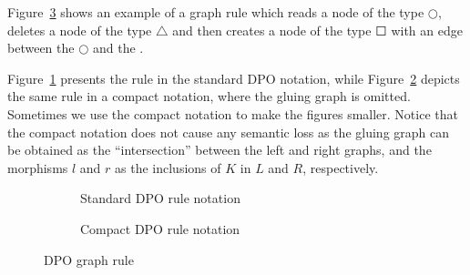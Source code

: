 \begin{example} Figure~\ref{fig:gts:rule} shows an example of a graph rule which reads a node of the type $\Circle$, deletes a node of the type $\triangle$ and then creates a node of the type $\Square$ with an edge between the $\Circle$ and the \Square. 
  
Figure~\ref{fig:gts:rule-standard} presents the rule in the standard DPO notation, while Figure~\ref{fig:gts:rule-compact} depicts the same rule in a compact notation, where the gluing graph is omitted. Sometimes we use the compact notation to make the figures smaller. Notice that the compact notation does not cause any semantic loss as the gluing graph can be obtained as the ``intersection'' between the left and right graphs, and the morphisms $l$ and $r$ as the inclusions of $K$ in $L$ and $R$, respectively.

\begin{figure}[!ht]
  \centering
  \begin{subfigure}[t]{.5\textwidth}
    \centerline{}
    \caption{Standard DPO rule notation}\label{fig:gts:rule-standard}
  \end{subfigure}

  \begin{subfigure}[t]{.5\textwidth}
    \centerline{}
    \caption{Compact DPO rule notation}\label{fig:gts:rule-compact}
  \end{subfigure}
  \caption{DPO graph rule}\label{fig:gts:rule}
\end{figure}
\end{example}

